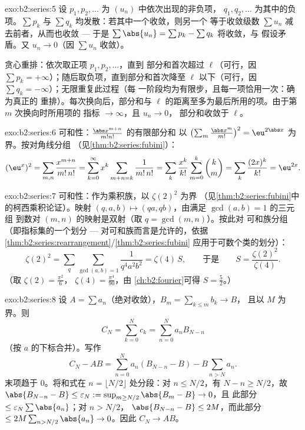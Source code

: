 \begin{solution}{exo:b2:series:5}
设 $p_1, p_2, \dots$ 为 $(u_n)$ 中依次出现的非负项，
$q_1, q_2, \dots$ 为其中的负项。$\sum p_k$ 与 $\sum
q_k$ 均发散：若其中一个收敛，则另一个
等于收敛级数 $\sum u_n$ 减去前者，从而也收敛 --- 于是
$\sum \abs{u_n} = \sum p_k - \sum q_k$ 将收敛，与
假设矛盾。又 $u_n \to 0$（因 $\sum u_n$ 收敛）。

贪心重排：依次取正项 $p_1, p_2, \dots$，直到
部分和首次超过 $\ell$（可行，因 $\sum p_k =
+\infty$）；随后取负项，直到部分和首次降至
$\ell$ 以下（可行，因 $\sum q_k = -\infty$）；无限重复此过程（每
一阶段均为有限步，且每一项恰用一次：确为真正的
重排）。每次换向后，部分和与
$\ell$ 的距离至多为最后所用的项。由于第 $m$ 次换向时所用项的
指标 $\to \infty$，且 $u_n \to 0$，
部分和收敛于 $\ell$。
\end{solution}

\begin{solution}{exo:b2:series:6}
可和性：$\frac{\abs x^{m+n}}{m!n!}$ 的有限部分和
以 $\bigl(\sum_m
\frac{\abs x^m}{m!}\bigr)^2 = \eu^{2\abs x}$ 为界。按对角线分组
（见\cref{thm:b2:series:fubini}）：
\[
(\eu^{x})^2 = \sum_{m,n} \frac{x^{m+n}}{m!\,n!}
= \sum_{k=0}^{\infty} x^k \sum_{m+n=k} \frac{1}{m!\,n!}
= \sum_k \frac{x^k}{k!}\sum_{m=0}^{k}\binom km
= \sum_k \frac{(2x)^k}{k!} = \eu^{2x} .
\]
\end{solution}

\begin{solution}{exo:b2:series:7}
可和性：作为乘积族，以 $\zeta(2)^2$ 为界
（见\cref{thm:b2:series:fubini}中的柯西乘积论证）。映射
$(q, a, b) \mapsto (qa, qb)$，由满足 $\gcd(a, b) = 1$ 的三元组
到数对 $(m, n)$ 的映射是双射（取 $q = \gcd(m,n)$）。按此对
可和族分组（即指标集的一个划分 --- 
对可和族而言是允许的，依据
\cref{thm:b2:series:rearrangement}/\cref{thm:b2:series:fubini}
应用于可数个类的划分）：
\[
\zeta(2)^2 = \sum_{q} \sum_{\gcd(a,b)=1} \frac{1}{q^4 a^2 b^2}
= \zeta(4)\, S,
\qquad\text{于是}\qquad
S = \frac{\zeta(2)^2}{\zeta(4)} .
\]
（取 $\zeta(2) = \frac{\pi^2}{6}$，
$\zeta(4) = \frac{\pi^4}{90}$，由
\cref{ch:b2:fourier}可得 $S = \frac{5}{2}$。）
\end{solution}

\begin{solution}{exo:b2:series:8}
设 $A = \sum a_n$（绝对收敛），$B_m = \sum_{k\leq m} b_k \to B$，
且以 $M$ 为界。则
\[
C_N = \sum_{k=0}^{N} c_k = \sum_{n=0}^{N} a_n B_{N-n}
\]
（按 $a$ 的下标合并）。写作
\[
C_N - AB = \sum_{n=0}^{N} a_n (B_{N-n} - B) - B\sum_{n > N} a_n .
\]
末项趋于 $0$。将和式在 $n = \lfloor N/2
\rfloor$ 处分段：对 $n \leq N/2$，有 $N - n \geq N/2$，故 $\abs{B_{N-n} - B}
\leq \varepsilon_N := \sup_{m \geq N/2}\abs{B_m - B} \to 0$，且
此部分 $\leq \varepsilon_N \sum\abs{a_n}$；对 $n > N/2$，
$\abs{B_{N-n} - B} \leq 2M$，而此部分 $\leq 2M \sum_{n >
N/2} \abs{a_n} \to 0$。因此 $C_N \to AB$。
\end{solution}

